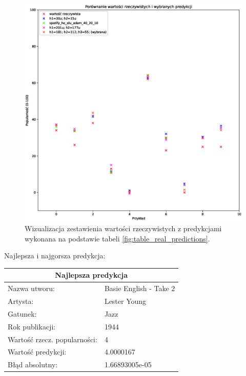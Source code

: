 \documentclass[a4paper,12pt]{article}
\numberwithin{figure}{section}
\begin{document}
    \smallskip

    \begin{figure}[H]
        \centering
        \includegraphics[width=\textwidth]{compr_samples_real_predictions}
        \caption{Wizualizacja zestawienia wartości rzeczywistych z predykcjami wykonana na podstawie tabeli \ref{fig:table_real_predictions}.}
        \label{fig:compr_samples_real_predictions}
    \end{figure}

    \bigskip

    Najlepsza i najgorsza predykcja:

    \bigskip

    \noindent
    \begin{minipage}[H]{\textwidth}
        \begin{tabular}{|p{}|p{}|}
            \hline
            \multicolumn{2}{|c|}{Najlepsza predykcja} \\
            \hline
            Nazwa utworu:                & Basie English - Take 2 \\
            Artysta:                     & Lester Young           \\
            Gatunek:                     & Jazz                   \\
            Rok publikacji:              & 1944                   \\
            Wartość rzecz. popularności: & 4                      \\
            Wartość predykcji:           & 4.0000167              \\
            Błąd absolutny:              & 1.66893005e-05         \\
            \hline
        \end{tabular}
    \end{minipage}
\end{document}
